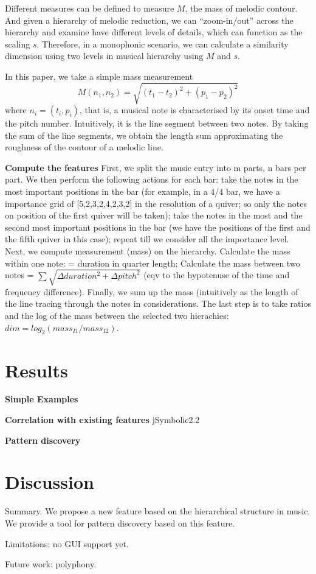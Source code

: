 Different measures can be defined to measure $M$, the mass of melodic contour.
And given a hierarchy of melodic reduction, we can ``zoom-in/out'' across the hierarchy and examine have different levels of details, which can function as the scaling $s$.
Therefore, in a monophonic scenario, we can calculate a similarity dimension using two levels in musical hierarchy using $M$ and $s$. 

In this paper, we take a simple mass measurement
$$M(n_1, n_2) = \sqrt{(t_1-t_2)^2 +(p_1-p_2)^2}$$
  where $n_i=(t_i, p_i)$, that is, a musical note is characterised by its onset time and the pitch number. 
Intuitively, it is the line segment between two notes.
By taking the sum of the line segments, we obtain the length sum approximating the roughness of the contour of a melodic line.

\textbf{Compute the features}
First, we split the music entry into m parts, n bars per part.
We then perform the following actions for each bar: take the notes in the most important positions in the bar (for example, in a 4/4 bar, we have a importance grid of [5,2,3,2,4,2,3,2] in the resolution of a quiver; so only the notes on position of the first quiver will be taken); take the notes in the most and the second most important positions in the bar (we have the positions of the first and the fifth quiver in this case); repeat till we consider all the importance level. Next, we compute measurement (mass) on the hierarchy. Calculate the mass within one note: = duration in quarter length; Calculate the mass between two notes =  $\sum \sqrt{\Delta duration^2 + \Delta pitch^2}$ (eqv to the hypotenuse of the time and frequency difference). Finally, we sum up the mass (intuitively as the length of the line tracing through the notes in considerations. The last step is to take ratios and the log of the mass between the selected two hierachies: $dim = log_2(mass_{I1}/mass_{I2})$.


\section{Results}

\textbf{Simple Examples}

\textbf{Correlation with existing features} jSymbolic2.2

\textbf{Pattern discovery}

\section{Discussion}
 
Summary. We propose a new feature based on the hierarchical structure in music. We provide a tool for pattern discovery based on this feature.

Limitations: no GUI support yet. 

Future work: polyphony. 

